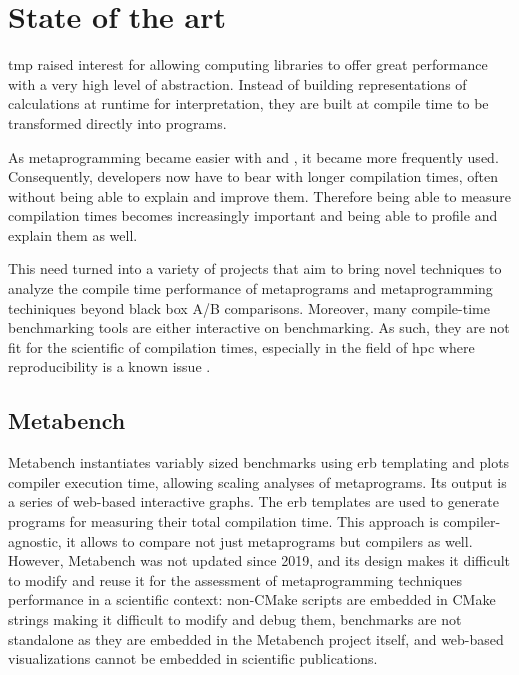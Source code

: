 \documentclass[../main]{subfiles}
\begin{document}
\section{
  State of the art
}

\cpp \gls{tmp} raised interest for allowing computing libraries
to offer great performance with a very high level of abstraction.
Instead of building representations of calculations at runtime for
interpretation, they are built at compile time to be transformed directly into
programs.

As metaprogramming became easier with  and ,
it became more frequently used.
Consequently, developers now have to bear with longer
compilation times, often without being able to explain and improve them.
Therefore being able to measure compilation times becomes increasingly important
and being able to profile and explain them as well.

This need turned into a variety of projects that aim to bring novel techniques
to analyze the compile time performance of \cpp metaprograms and metaprogramming
techiniques beyond black box A/B comparisons. Moreover, many compile-time
benchmarking tools are either interactive on benchmarking. As such, they are
not fit for the scientific of compilation times, especially in the field of
\gls{hpc} where reproducibility is a known issue
\cite{antunes2024reproducibility}.

\subsection{
  Metabench
}

Metabench\cite{metabench} instantiates variably sized benchmarks using
\gls{erb} templating and plots compiler execution time, allowing
scaling analyses of metaprograms. Its output is a series of web-based
interactive graphs.
The \gls{erb} templates are used to generate \cpp programs for measuring their
total compilation time. This approach is compiler-agnostic, it allows to compare
not just metaprograms but compilers as well.
\\

However, Metabench was not updated since 2019, and its design makes it
difficult to modify and reuse it for the assessment of metaprogramming
techniques performance in a scientific context:
non-CMake scripts are embedded in CMake strings making it difficult to modify
and debug them, benchmarks are not standalone as they are embedded
in the Metabench project itself, and web-based visualizations cannot be embedded
in scientific publications.
\end{document}
